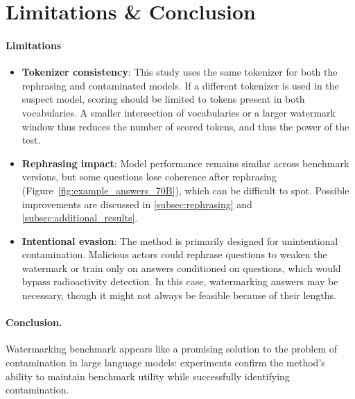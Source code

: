 \vspace{-0.1cm}
\section{Limitations \& Conclusion }\label{sec:conclusion}

\paragraph{\textbf{Limitations}}
\begin{itemize}[leftmargin=*]
\item \textbf{Tokenizer consistency}: This study uses the same tokenizer for both the rephrasing and contaminated models.
If a different tokenizer is used in the suspect model, scoring should be limited to tokens present in both vocabularies. 
A smaller intersection of vocabularies or a larger watermark window thus reduces the number of scored tokens, and thus the power of the test.
\item \textbf{Rephrasing impact}: Model performance remains similar across benchmark versions, but some questions lose coherence after rephrasing (\eg Figure~\ref{fig:example_answers_70B}), which can be difficult to spot.
Possible improvements are discussed in \autoref{subsec:rephrasing} and \autoref{subsec:additional_results}.
\item \textbf{Intentional evasion}: The method is primarily designed for unintentional contamination.
Malicious actors could rephrase questions to weaken the watermark or train only on answers conditioned on questions, which would bypass radioactivity detection. 
In this case, watermarking answers may be necessary, though it might not always be feasible because of their lengths.
\end{itemize}


\paragraph{\textbf{Conclusion.}} 
Watermarking benchmark appears like a promising solution to the problem of contamination in large language models: experiments confirm the method's ability to maintain benchmark utility while successfully identifying contamination. 